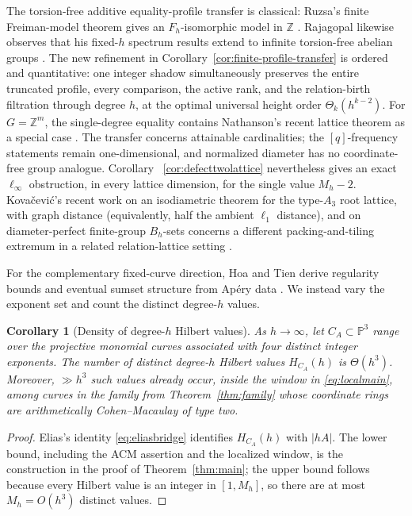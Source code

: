 \documentclass[11pt,reqno]{amsart}
\newtheorem{corollary}[theorem]{Corollary}
\theoremstyle{definition}
\theoremstyle{remark}
\begin{document}
The torsion-free additive equality-profile transfer is classical: Ruzsa's
finite Freiman-model theorem gives an $F_h$-isomorphic model in $\mathbb Z$
\cite[Part~II, Lemma~2.3.4]{GeroldingerRuzsa2009}.  Rajagopal likewise
observes that his fixed-$h$ spectrum results extend to infinite torsion-free
abelian groups \cite[Section~5.4]{Rajagopal2026}.  The new refinement in
Corollary~\ref{cor:finite-profile-transfer} is ordered and quantitative: one
integer shadow simultaneously preserves the entire truncated profile, every
comparison, the active rank, and the relation-birth filtration through degree
$h$, at the optimal universal height order $\Theta_k(h^{k-2})$.  For
$G=\mathbb Z^m$, the single-degree equality contains Nathanson's recent
lattice theorem as a special case \cite[Theorem~1]{NathansonLattice2026}.
The transfer concerns attainable
cardinalities; the $[q]$-frequency statements remain one-dimensional, and
normalized diameter has no coordinate-free group analogue.  Corollary~
\ref{cor:defecttwolattice} nevertheless gives an exact $\ell_\infty$
obstruction, in every lattice dimension, for the single value $M_h-2$.
Kova\v{c}evi\'{c}'s recent work on an isodiametric theorem for the type-$A_3$
root lattice, with graph distance (equivalently, half the ambient $\ell_1$
distance), and on diameter-perfect finite-group $B_h$-sets concerns a
different packing-and-tiling extremum in a related relation-lattice setting
\cite{Kovacevic2026}.

For the complementary fixed-curve direction, Hoa and Tien derive regularity
bounds and eventual sumset structure from Ap\'ery data
\cite{HoaTien2026}.  We instead vary the exponent set and count the distinct
degree-$h$ values.

\begin{corollary}[Density of degree-$h$ Hilbert values]\label{cor:hilbert-density}
As $h\to\infty$, let $C_A\subset\mathbb P^3$ range over the projective monomial curves
associated with four distinct integer exponents.  The number of distinct
degree-$h$ Hilbert values $H_{C_A}(h)$ is $\Theta(h^3)$.  Moreover,
$\gg h^3$ such values already occur, inside the window in
\eqref{eq:localmain}, among curves in the family from
Theorem~\ref{thm:family} whose coordinate rings are arithmetically
Cohen--Macaulay of type two.
\end{corollary}

\par\medskip
\begin{proof}
Elias's identity \eqref{eq:eliasbridge} identifies $H_{C_A}(h)$ with
$|hA|$.  The lower bound, including the ACM assertion and the localized
window, is the construction in the proof of Theorem~\ref{thm:main}; the
upper bound follows because every Hilbert value is an integer in
$[1,M_h]$, so there are at most $M_h=O(h^3)$ distinct values.
\end{proof}
\end{document}
